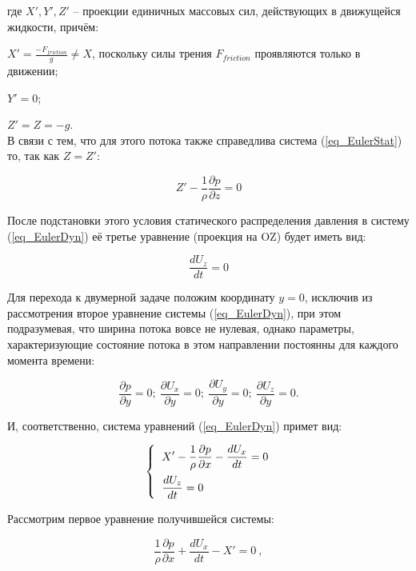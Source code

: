 \noindent где $X', Y', Z'$ -- проекции единичных массовых сил, действующих в движущейся жидкости, причём:

\vspace{0.2cm}

$ \displaystyle X' = \frac{ -F_{friction} }{g} \neq X $, поскольку силы трения $ F_{friction} $ проявляются только в движении; 

$ Y' = 0 $;

$ Z' = Z = -g $. \\ 


В связи с тем, что для этого потока также справедлива система (\ref{eq_EulerStat}) то, так как $ Z = Z' $:

$$ 
  \displaystyle Z' - \frac{1}{\rho} \frac{\partial p}{\partial z} = 0
$$

После подстановки этого условия статического распределения давления в систему (\ref{eq_EulerDyn}) её третье уравнение (проекция на OZ) будет иметь вид:

$$
  \displaystyle \frac{d U_z}{d t} = 0
$$

Для перехода к двумерной задаче положим координату $ y = 0 $, исключив из рассмотрения второе уравнение системы (\ref{eq_EulerDyn}), при этом подразумевая, что ширина потока вовсе не нулевая, однако параметры, характеризующие состояние потока в этом направлении постоянны для каждого момента времени:

\begin{equation}
   \label{eq_uslov2d}
   \displaystyle \frac{\partial p}{\partial y} = 0 ;\  \frac{\partial U_x}{\partial y} = 0 ;\  \frac{\partial U_y}{\partial y} = 0 ;\  \frac{\partial U_z}{\partial y} = 0 .
\end{equation}

И, соответственно, система уравнений (\ref{eq_EulerDyn}) примет вид:

$$
   \left\{
{\setlength\arraycolsep{2pt}
  \begin{array}{rl}
     \vspace{5pt}
    & \displaystyle  X' - \frac{1}{\rho} \frac{ \partial p}{ \partial x} - \frac{d U_x}{d t} = 0  \\
    & \displaystyle  \frac{d U_z}{d t} = 0 
  \end{array}
}
\right.
$$

\vspace{1cm}

Рассмотрим первое уравнение получившейся системы:

\begin{equation}
  \label{eq_uravnDvi1}
  \displaystyle \frac{1}{\rho} \frac{ \partial p}{ \partial x} + \frac{d U_x}{d t} - X' = 0 \ ,
\end{equation}

